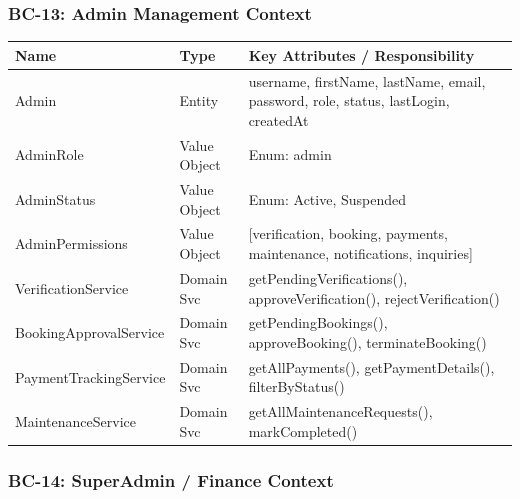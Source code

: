 \documentclass[12pt,a4paper]{article}
\begin{document}
\subsubsection{BC-13: Admin Management Context}

\begin{center}
\begin{tabular}{@{}p{3.5cm}p{2cm}p{8.5cm}@{}}
\toprule
\textbf{Name} & \textbf{Type} & \textbf{Key Attributes / Responsibility} \\
\midrule
Admin & Entity & username, firstName, lastName, email, password, role, status, lastLogin, createdAt \\
AdminRole & Value Object & Enum: admin \\
AdminStatus & Value Object & Enum: Active, Suspended \\
AdminPermissions & Value Object & [verification, booking, payments, maintenance, notifications, inquiries] \\
VerificationService & Domain Svc & getPendingVerifications(), approveVerification(), rejectVerification() \\
BookingApprovalService & Domain Svc & getPendingBookings(), approveBooking(), terminateBooking() \\
PaymentTrackingService & Domain Svc & getAllPayments(), getPaymentDetails(), filterByStatus() \\
MaintenanceService & Domain Svc & getAllMaintenanceRequests(), markCompleted() \\
\bottomrule
\end{tabular}
\end{center}

\subsubsection{BC-14: SuperAdmin / Finance Context}
\end{document}
